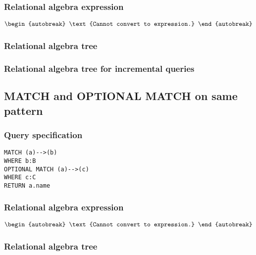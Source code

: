 \subsubsection*{Relational algebra expression}

\begin{align*}
\begin{autobreak}
\text{Cannot convert to expression.}
\end{autobreak}
\end{align*}

\subsubsection*{Relational algebra tree}


\subsubsection*{Relational algebra tree for incremental queries}


\subsection{MATCH and OPTIONAL MATCH on same pattern}

\subsubsection*{Query specification}

\begin{lstlisting}
MATCH (a)-->(b)
WHERE b:B
OPTIONAL MATCH (a)-->(c)
WHERE c:C
RETURN a.name
\end{lstlisting}

\subsubsection*{Relational algebra expression}

\begin{align*}
\begin{autobreak}
\text{Cannot convert to expression.}
\end{autobreak}
\end{align*}

\subsubsection*{Relational algebra tree}

